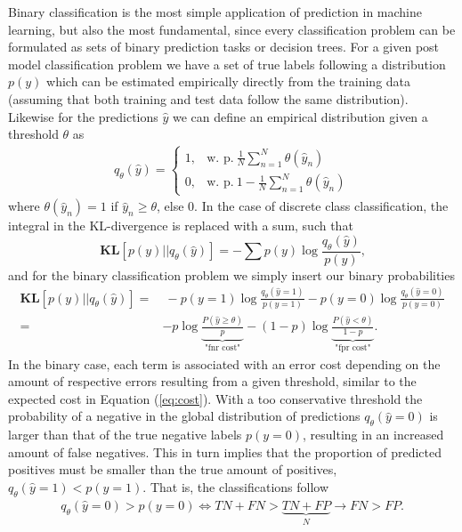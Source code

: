 \documentclass{article}
\begin{document}
Binary classification is the most simple application of prediction in machine learning, but also the most fundamental, since every classification problem can be formulated as sets of binary prediction tasks or decision trees. For a given post model classification problem we have a set of true labels following a distribution $p(y)$ which can be estimated empirically directly from the training data (assuming that both training and test data follow the same distribution). Likewise for the predictions $\hat{y}$ we can define an empirical distribution given a threshold $\theta$ as
\begin{align*}
    q_\theta(\hat{y}) = \begin{cases} 1, & \text{w. p.} \ \frac{1}{N}\sum_{n=1}^N \theta(\hat{y}_n) \\[0.2cm]
    0, &  \text{w. p.} \ 1 - \frac{1}{N}\sum_{n=1}^N \theta(\hat{y}_n) \end{cases}
\end{align*}\text{,}
where $\theta(\hat{y}_n) = 1$ if $\hat{y}_n \geq \theta$, else 0.
In the case of discrete class classification, the integral in the KL-divergence is replaced with a sum, such that
\begin{equation}
\textbf{KL}[p(y) \vert\vert q_\theta(\hat{y})] = -\sum p(y) \log \frac{q_\theta(\hat{y})}{p(y)}\text{,}
\end{equation}
and for the binary classification problem we simply insert our binary probabilities
\begin{align}
\textbf{KL}[p(y) \vert\vert q_\theta(\hat{y})] = & \ - p(y=1) \log \frac{q_\theta(\hat{y}=1)}{p(y=1)} - p(y=0) \log \frac{q_\theta(\hat{y}=0)}{p(y=0)} \\ = & \label{eq:tprfpr} -p \log \underbrace{\frac{P(\hat{y}\geq \theta)}{p}}_\text{"fnr cost"} - (1-p) \log \underbrace{\frac{P(\hat{y} < \theta)}{1-p}}_\text{"fpr cost"} \text{.}
\end{align}
In the binary case, each term is associated with an error cost depending on the amount of respective errors resulting from a given threshold, similar to the expected cost in Equation (\ref{eq:cost}). With a too conservative threshold the probability of a negative in the global distribution of predictions $q_\theta (\hat{y}=0)$ is larger than that of the true negative labels $p(y=0)$, resulting in an increased amount of false negatives. This in turn implies that the proportion of predicted positives must be smaller than the true amount of positives, $q_\theta(\hat{y} = 1) < p(y=1)$. That is, the classifications follow
\begin{align*}
    q_\theta(\hat{y}=0) > p(y=0) \iff  TN + FN > \underbrace{TN+FP}_{N} \rightarrow FN>FP \text{.}
\end{align*}
\end{document}
